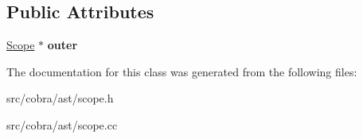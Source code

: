 \subsection*{Public Attributes}
\begin{DoxyCompactItemize}
\item 
\hypertarget{class_cobra_1_1internal_1_1_scope_adb3cfd7157d939009831473f4162e121}{\hyperlink{class_cobra_1_1internal_1_1_scope}{Scope} $\ast$ {\bfseries outer}}\label{class_cobra_1_1internal_1_1_scope_adb3cfd7157d939009831473f4162e121}

\end{DoxyCompactItemize}


The documentation for this class was generated from the following files\+:\begin{DoxyCompactItemize}
\item 
src/cobra/ast/scope.\+h\item 
src/cobra/ast/scope.\+cc\end{DoxyCompactItemize}
